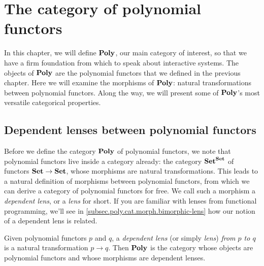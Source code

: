 \documentclass[Book-Poly]{subfiles}
\begin{document}
\chapter{The category of polynomial functors} \label{ch.poly.cat}


In this chapter, we will define $\mathbf{Poly}$, our main category of interest, so that we have a firm foundation from which to speak about interactive systems.
The objects of $\mathbf{Poly}$ are the polynomial functors that we defined in the previous chapter.
Here we will examine the morphisms of $\mathbf{Poly}$: natural transformations between polynomial functors.
Along the way, we will present some of $\mathbf{Poly}$'s most versatile categorical properties.



\section{Dependent lenses between polynomial functors}
\label{sec.poly.cat.morph}


Before we define the category $\mathbf{Poly}$ of polynomial functors, we note that polynomial functors live inside a category already: the category $\mathbf{Set}^{\mathbf{Set}}$ of functors $\mathbf{Set}\to\mathbf{Set}$, whose morphisms are natural transformations.
This leads to a natural definition of morphisms between polynomial functors, from which we can derive a category of polynomial functors for free.
We call such a morphism a \emph{dependent lens}, or a \emph{lens} for short.
If you are familiar with lenses from functional programming, we'll see in \cref{subsec.poly.cat.morph.bimorphic-lens} how our notion of a dependent lens is related.


\begin{definition} \label{def.poly_cat}
Given polynomial functors $p$ and $q$, a \emph{dependent lens} (or simply \emph{lens}) \emph{from $p$ to $q$} is a natural transformation $p\to q$.
Then $\mathbf{Poly}$ is the category whose objects are polynomial functors and whose morphisms are dependent lenses.
\end{definition}
\end{document}
